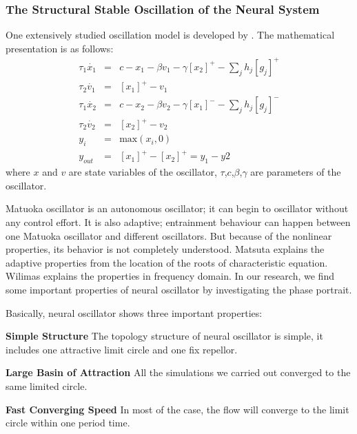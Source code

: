 \subsubsection{The Structural Stable Oscillation of the Neural System}
One extensively studied oscillation model is developed by \citet{neurooscillation}. 
The mathematical presentation is as follows:
\begin{eqnarray}
\tau_{1} \dot{x_{1}}&=&c-x_{1}-\beta v_{1}-\gamma [x_{2}]^{+}-\sum_{j}h_{j}[g_{j}]^{+}\\
\tau_{2} \dot{v_{1}}&=&[x_{1}]^{+}-v_{1}\\
\tau_{1} \dot{x_{2}}&=&c-x_{2}-\beta v_{2}-\gamma [x_{1}]^{-}-\sum_{j}h_{j}[g_{j}]^{-}\\
\tau_{2} \dot{v_{2}}&=&[x_{2}]^{+}-v_{2}\\
y_{i}&=&\mbox{max}(x_{i},0)\\
y_{out}&=&[x_{1}]^{+}-[x_{2}]^{+}=y_{1}-y{2}
\label{eq:matsuta}
\end{eqnarray}
where $x$ and $v$ are state variables of the oscillator, $\tau$,$c$,$\beta$,$\gamma$ are parameters of the oscillator.

Matuoka oscillator is an autonomous oscillator; it can begin to oscillator without any control effort.
It is also adaptive; entrainment behaviour can happen between one Matuoka oscillator and different oscillators. 
But because of the nonlinear properties, its behavior is not completely understood. 
Matsuta\citep{Matsuoka1987} explains the adaptive properties from the location of the roots of  characteristic equation. 
Wilimas\citep{Williamson1998} explains the properties in frequency domain.
In our research, we find some important properties of neural oscillator by investigating the phase portrait.


Basically, neural oscillator shows three important properties:

\textbf{Simple Structure}
The topology structure of neural oscillator is simple, 
it includes one  attractive limit circle and one fix repellor.

\textbf{Large Basin of Attraction}
All the simulations we carried out converged to the same limited circle.

\textbf{Fast Converging Speed}
In most of the case, the flow will converge to the limit circle within one period time.

